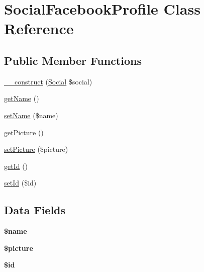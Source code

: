 \hypertarget{class_social_facebook_profile}{\section{Social\+Facebook\+Profile Class Reference}
\label{class_social_facebook_profile}
}
\subsection*{Public Member Functions}
\begin{DoxyCompactItemize}
\item 
\hyperlink{class_social_facebook_profile_ad07e6b7f7a6cd38bd1b21cf48da4a5d0}{\+\_\+\+\_\+construct} (\hyperlink{class_social}{Social} \$social)
\item 
\hyperlink{class_social_facebook_profile_a3d0963e68bb313b163a73f2803c64600}{get\+Name} ()
\item 
\hyperlink{class_social_facebook_profile_a2fe666694997d047711d7653eca2f132}{set\+Name} (\$name)
\item 
\hyperlink{class_social_facebook_profile_aa10a041137b00a6f0a79916f4009924f}{get\+Picture} ()
\item 
\hyperlink{class_social_facebook_profile_ad822b1785ceddeb91452e90dd910d2ee}{set\+Picture} (\$picture)
\item 
\hyperlink{class_social_facebook_profile_a12251d0c022e9e21c137a105ff683f13}{get\+Id} ()
\item 
\hyperlink{class_social_facebook_profile_a87313ad678fb2a2a8efb435cf0bdb9a0}{set\+Id} (\$id)
\end{DoxyCompactItemize}
\subsection*{Data Fields}
\begin{DoxyCompactItemize}
\item 
\hypertarget{class_social_facebook_profile_ab2fc40d43824ea3e1ce5d86dee0d763b}{{\bfseries \$name}}\label{class_social_facebook_profile_ab2fc40d43824ea3e1ce5d86dee0d763b}

\item 
\hypertarget{class_social_facebook_profile_a6ed313adb3a8ef1daf8fafdc842b09d1}{{\bfseries \$picture}}\label{class_social_facebook_profile_a6ed313adb3a8ef1daf8fafdc842b09d1}

\item 
\hypertarget{class_social_facebook_profile_ae97941710d863131c700f069b109991e}{{\bfseries \$id}}\label{class_social_facebook_profile_ae97941710d863131c700f069b109991e}

\end{DoxyCompactItemize}


